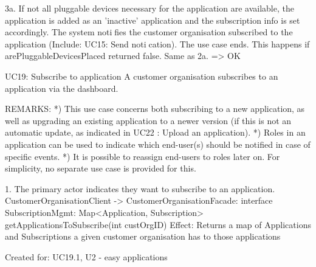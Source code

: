 {{{                3a. If not all pluggable devices necessary for the application are available, the application is added
                as an 'inactive' application and the subscription info is set accordingly. The system notifies
                the customer organisation subscribed to the application (Include: UC15: Send notication). The use case ends.
                    This happens if arePluggableDevicesPlaced returned false.
                    Same as 2a. => OK

        UC19: Subscribe to application
            A customer organisation subscribes to an application via the dashboard.

            REMARKS:
                *) This use case concerns both subscribing to a new application, as well as upgrading an existing
                   application to a newer version (if this is not an automatic update, as indicated in UC22 : Upload an application).
                *) Roles in an application can be used to indicate which end-user(s) should be notified in case of specific events.
                *) It is possible to reassign end-users to roles later on. For simplicity, no separate use case is provided for this.

            1. The primary actor indicates they want to subscribe to an application.
                    CustomerOrganisationClient -> CustomerOrganisationFacade: interface SubscriptionMgmt: Map<Application, Subscription> getApplicationsToSubscribe(int custOrgID)
                        Effect: Returns a map of Applications and Subscriptions a given customer organisation has to those applications
                        \item Created for: UC19.1, U2 - easy applications

}}}
